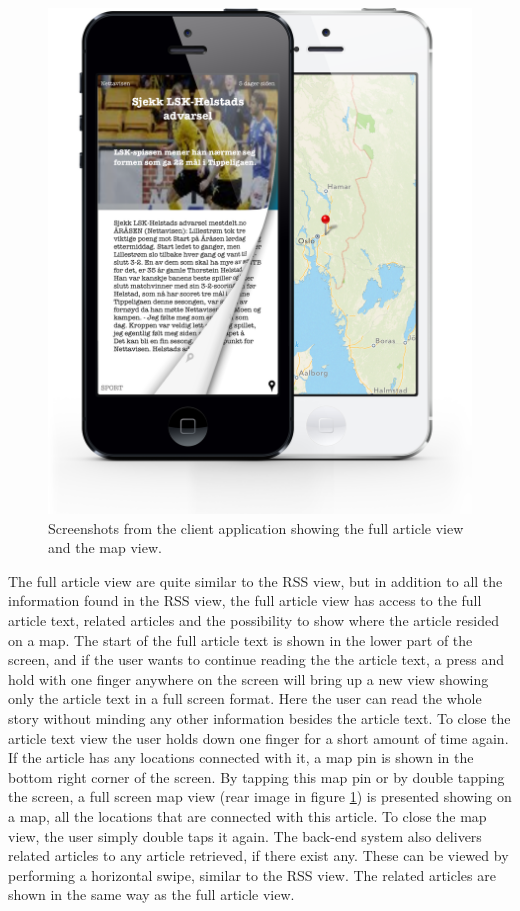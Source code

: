 \begin{figure}[!htbp]
\centering
\includegraphics[width=120mm]{GFX/clientApp/swipeForSimilarAndMap.png}
\caption{Screenshots from the client application showing the full article view and the map view.}
\label{screenshots_nyhetene_full_article_and_map}
\end{figure}


The full article view are quite similar to the RSS view, but in addition to all the information found in the RSS view, the full article view has access to the full article text, related articles and the possibility to show where the article resided on a map. The start of the full article text is shown in the lower part of the screen, and if the user wants to continue reading the the article text, a press and hold with one finger anywhere on the screen will bring up a new view showing only the article text in a full screen format. Here the user can read the whole story without minding any other information besides the article text. To close the article text view the user holds down one finger for a short amount of time again. If the article has any locations connected with it, a map pin is shown in the bottom right corner of the screen. By tapping this map pin or by double tapping the screen, a full screen map view (rear image in figure \ref{screenshots_nyhetene_full_article_and_map}) is presented showing on a map, all the locations that are connected with this article. To close the map view, the user simply double taps it again. The back-end system also delivers related articles to any article retrieved, if there exist any. These can be viewed by performing a horizontal swipe, similar to the RSS view. The related articles are shown in the same way as the full article view.

